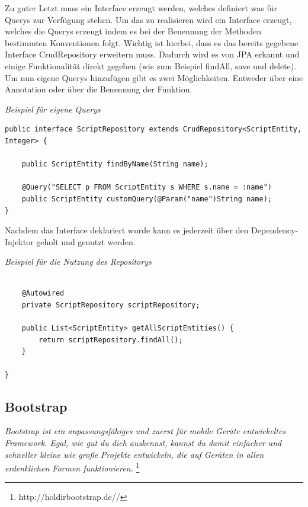 Zu guter Letzt muss ein Interface erzeugt werden, welches definiert was für Querys zur Verfügung stehen. Um das zu realisieren wird ein Interface erzeugt, welches die Querys erzeugt indem es bei der Benennung der Methoden bestimmten Konventionen folgt. Wichtig ist hierbei, dass es das bereits gegebene Interface CrudRepository erweitern muss. Dadurch wird es von JPA erkannt und einige Funktionalität direkt gegeben (wie zum Beispiel findAll, save und delete).
Um nun eigene Querys hinzufügen gibt es zwei Möglichkeiten. Entweder über eine Annotation oder über die Benennung der Funktion. \\

\begin{minipage}{\textwidth}
\emph{Beispiel für eigene Querys}
\begin{lstlisting}
public interface ScriptRepository extends CrudRepository<ScriptEntity, Integer> {

	public ScriptEntity findByName(String name);
	
	@Query("SELECT p FROM ScriptEntity s WHERE s.name = :name")
	public ScriptEntity customQuery(@Param("name")String name);
}
\end{lstlisting}
\end{minipage}

Nachdem das Interface deklariert wurde kann es jederzeit über den Dependency-Injektor geholt und genutzt werden.\\

\begin{minipage}{\textwidth}
\emph{Beispiel für die Nutzung des Repositorys}
\begin{lstlisting}

	@Autowired
	private ScriptRepository scriptRepository;
	
	public List<ScriptEntity> getAllScriptEntities() {
		return scriptRepository.findAll();
	}
	
}
\end{lstlisting}
\end{minipage}

\subsection{Bootstrap}

\emph{\glqq   
Bootstrap ist ein anpassungsfähiges und zuerst für mobile Geräte entwickeltes Framework. Egal, wie gut du dich auskennst, kannst du damit einfacher und schneller kleine wie große Projekte entwickeln, die auf Geräten in allen erdenklichen Formen funktionieren.
\grqq} \footnote{http://holdirbootstrap.de//} \\

